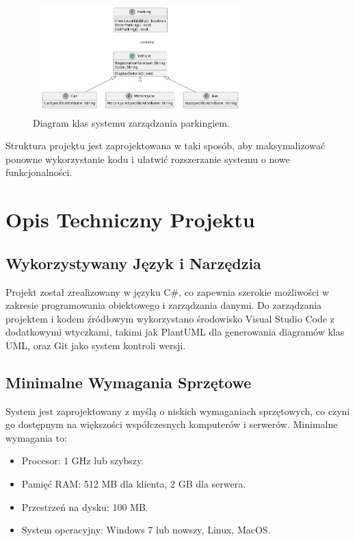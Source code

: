 \documentclass{article}
\begin{document}
\begin{figure}[H]
\centering
\includegraphics[width=0.75\textwidth]{photos/diagram.png}
\caption{Diagram klas systemu zarządzania parkingiem.}
\end{figure}

Struktura projektu jest zaprojektowana w taki sposób, aby maksymalizować ponowne wykorzystanie kodu i ułatwić rozszerzanie systemu o nowe funkcjonalności.
\section{Opis Techniczny Projektu}

\subsection{Wykorzystywany Język i Narzędzia}
Projekt został zrealizowany w języku C\#, co zapewnia szerokie możliwości w zakresie programowania obiektowego i zarządzania danymi. Do zarządzania projektem i kodem źródłowym wykorzystano środowisko Visual Studio Code z dodatkowymi wtyczkami, takimi jak PlantUML dla generowania diagramów klas UML, oraz Git jako system kontroli wersji.

\subsection{Minimalne Wymagania Sprzętowe}
System jest zaprojektowany z myślą o niskich wymaganiach sprzętowych, co czyni go dostępnym na większości współczesnych komputerów i serwerów. Minimalne wymagania to:
\begin{itemize}
    \item Procesor: 1 GHz lub szybszy.
    \item Pamięć RAM: 512 MB dla klienta, 2 GB dla serwera.
    \item Przestrzeń na dysku: 100 MB.
    \item System operacyjny: Windows 7 lub nowszy, Linux, MacOS.
\end{itemize}
\end{document}
